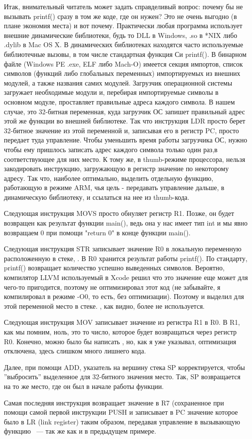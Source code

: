 Итак, внимательный читатель может задать справделивый вопрос: почему бы не вызывать printf() сразу в том же коде,
где он нужен? Это не очень выгодно (в плане экономия места) и вот почему. Практически любая программа использует внешние динамические библиотеки, будь то DLL в Windows, .so в *NIX либо .dylib в Mac OS X. В динамических библиотеках
находятся часто используемые библиотечные вызовы, в том числе стандартная функция Си printf(). В бинарном файле (Windows PE .exe, ELF либо Mach-O) имеется секция импортов, список символов (функций либо глобальных переменных) импортируемых из внешних модулей, а также названия самих модулей. Загрузчик операционной системы загружает необходимые
модули и, перебирая импортируемые символы в основном модуле, проставляет правильные адреса каждого символа.
В нашем случае,  это 32-битная переменная, куда загрузчик ОС запишет правильный адрес этой же функции во внешней библиотеке. Так что инструкция LDR просто берет 32-битное значение из этой переменной и, записывая его в регистр PC, просто передает туда управление. 
Чтобы уменьшить время работы загрузчика ОС, нужно чтобы ему пришлось записать адрес каждого символа только один раз,в соответствующее для них место.
К тому же, в thumb-режиме процессора, нельзя закодировать инструкцию, загружающую в регистр значение по некоторому адресу. Так что, наиболее оптимально, выделить отдельную функцию, работающую в режиме ARM, чья цель - передавать
управление дальше, в динамическую библиотеку, и ссылаться на нее из thumb-кода.

Следующая инструкция MOVS просто обнуляет регистр R1. Позже, он будет возвращен как результат функции main(), ведь она у нас имеет тип int и мы явно возвращаем 0 при помощи "return 0" в конце функции main().

Следующая инструкция STR записывает значение R0 в локальную переменную расположенную в стеке, . В R0 хранится результат работы printf(). По стандарту, printf() возвращает количество успешно выведенных символов.
Вероятно, компилятор LLVM используемый в Xcode решил что это значение еще может для чего-то пригодится, поэтому не оптимизировал этот код (не забывайте, я компилировал в режиме -O0, то есть, без оптимизации). Поэтому и выделил
для этой переменной место в стеке. , как видно, более не используется.

Следующая инструкция MOV записывает значение из регистра R1 в R0. В R1, как мы помним, ноль, это то число, которое будет возвращаться через регистр R0. Конечно, можно было бы написать , но, как я уже указывал, оптимизация отключена, здесь слишком много лишнего кода.

Далее, при помощи ADD, указатель на вершину стека SP корректируется, чтобы ''выбросить'' выделенное для 32-битного 
значения место. Так, SP возвращается на то же место, где он был в начале работы функции.

Самая последняя инструкция  возвращает значение в R7 (сохраненное при помощи самой первой 
инструкции PUSH и записывает в PC значение которое было в LR (link register) таким образом, передавая управление
в вызывающую функцию ~--- так же как и в предыдущем примере.

